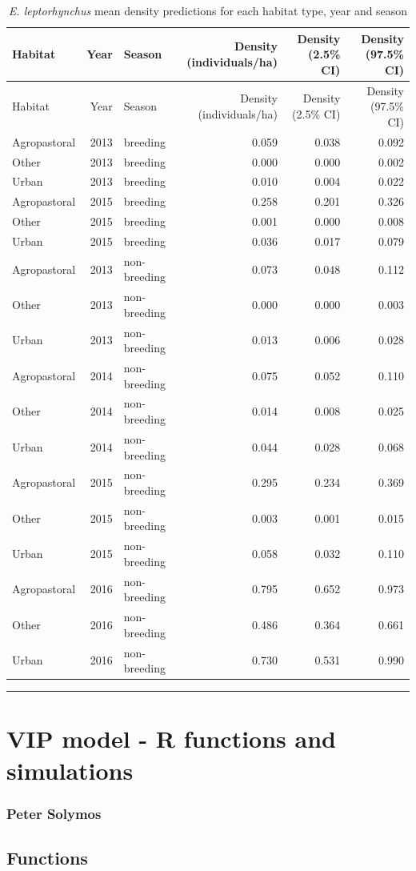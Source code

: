 \documentclass[]{article}
\begin{document}
\begin{longtable}[]{@{}lrlrrr@{}}
\caption{\textit{E. leptorhynchus} mean density predictions for each
habitat type, year and season}\tabularnewline
\toprule
Habitat & Year & Season & Density (individuals/ha) & Density (2.5\% CI)
& Density (97.5\% CI)\tabularnewline
\midrule
\endfirsthead
\toprule
Habitat & Year & Season & Density (individuals/ha) & Density (2.5\% CI)
& Density (97.5\% CI)\tabularnewline
\midrule
\endhead
Agropastoral & 2013 & breeding & 0.059 & 0.038 & 0.092\tabularnewline
Other & 2013 & breeding & 0.000 & 0.000 & 0.002\tabularnewline
Urban & 2013 & breeding & 0.010 & 0.004 & 0.022\tabularnewline
Agropastoral & 2015 & breeding & 0.258 & 0.201 & 0.326\tabularnewline
Other & 2015 & breeding & 0.001 & 0.000 & 0.008\tabularnewline
Urban & 2015 & breeding & 0.036 & 0.017 & 0.079\tabularnewline
Agropastoral & 2013 & non-breeding & 0.073 & 0.048 &
0.112\tabularnewline
Other & 2013 & non-breeding & 0.000 & 0.000 & 0.003\tabularnewline
Urban & 2013 & non-breeding & 0.013 & 0.006 & 0.028\tabularnewline
Agropastoral & 2014 & non-breeding & 0.075 & 0.052 &
0.110\tabularnewline
Other & 2014 & non-breeding & 0.014 & 0.008 & 0.025\tabularnewline
Urban & 2014 & non-breeding & 0.044 & 0.028 & 0.068\tabularnewline
Agropastoral & 2015 & non-breeding & 0.295 & 0.234 &
0.369\tabularnewline
Other & 2015 & non-breeding & 0.003 & 0.001 & 0.015\tabularnewline
Urban & 2015 & non-breeding & 0.058 & 0.032 & 0.110\tabularnewline
Agropastoral & 2016 & non-breeding & 0.795 & 0.652 &
0.973\tabularnewline
Other & 2016 & non-breeding & 0.486 & 0.364 & 0.661\tabularnewline
Urban & 2016 & non-breeding & 0.730 & 0.531 & 0.990\tabularnewline
\bottomrule
\end{longtable}

\begin{center}\rule{0.5\linewidth}{\linethickness}\end{center}

\section{VIP model - R functions and
simulations}\label{vip-model---r-functions-and-simulations}

\subsubsection{Peter Solymos}\label{peter-solymos}

\subsection{Functions}\label{functions}
\end{document}
